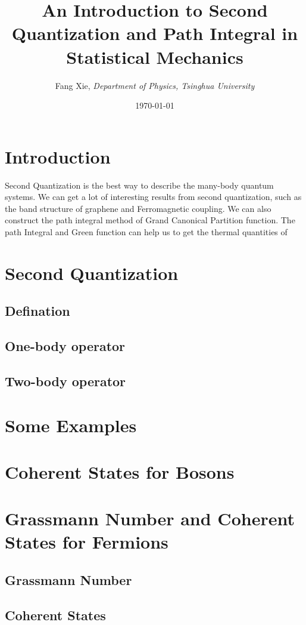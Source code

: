 \documentclass{article}
\author{Fang Xie, \emph{Department of Physics, Tsinghua University}}
\title{{\bf{An Introduction to Second Quantization and Path Integral in Statistical Mechanics}}}
\date{\today}
\begin{document}
\maketitle
\section{Introduction}
Second Quantization is the best way to describe the many-body quantum systems. We can get a lot of interesting results from second quantization, such as the band structure of graphene and Ferromagnetic coupling. We can also construct the path integral method of Grand Canonical Partition function. The path Integral and Green function can help us to get the thermal quantities of 

\section{Second Quantization}
\subsection{Defination}
\subsection{One-body operator}
\subsection{Two-body operator}

\section{Some Examples}

\section{Coherent States for Bosons}

\section{Grassmann Number and Coherent States for Fermions}
\subsection{Grassmann Number}
\subsection{Coherent States}
\end{document}
